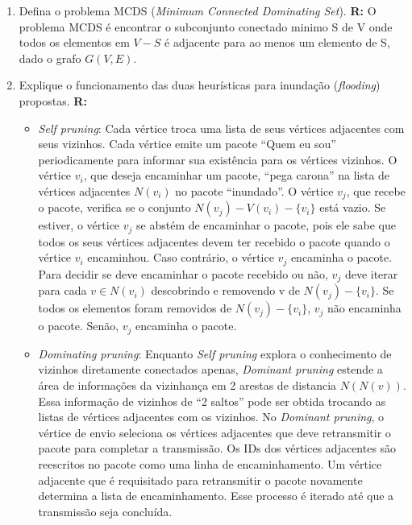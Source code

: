 \documentclass[a4paper,11pt,fleqn]{article}
\begin{document}
\begin{enumerate}
    \item{Defina o problema MCDS (\textit{Minimum Connected Dominating Set}).}
    \newline
    \textbf{R:}
        O problema MCDS é encontrar o subconjunto conectado minimo S de V
        onde todos os elementos em $V - S$ é adjacente para ao menos um elemento de S,
        dado o grafo $G(V,E)$.

    \item{Explique o funcionamento das duas heurísticas para inundação (\textit{flooding}) propostas.}
    \newline
    \textbf{R:}
        \begin{itemize}
            \item{\textit{Self pruning}:}
            Cada vértice troca uma lista de seus vértices adjacentes com
            seus vizinhos. Cada vértice emite um pacote ``Quem eu sou'' periodicamente
            para informar sua existência para os vértices vizinhos.
            O vértice $v_i$, que deseja encaminhar um pacote, ``pega carona'' na lista
            de vértices adjacentes $N(v_i)$ no pacote ``inundado''.
            O vértice $v_j$, que recebe o pacote, verifica se o conjunto $N(v_j) - V(v_i) - \{v_i\}$
            está vazio. Se estiver, o vértice $v_j$ se abstém de encaminhar o pacote, pois
            ele sabe que todos os seus vértices adjacentes devem ter recebido o pacote
            quando o vértice $v_i$ encaminhou. Caso contrário, o vértice $v_j$ encaminha o pacote.
            \newline
            Para decidir se deve encaminhar o pacote recebido ou não, $v_j$ deve iterar para
            cada $v \in N(v_i)$ descobrindo e removendo v de $N(v_j) - \{v_i\}$. Se todos os elementos
            foram removidos de $N(v_j) - \{v_i\}$, $v_j$ não encaminha o pacote. Senão, $v_j$ encaminha
            o pacote.

        \item{\textit{Dominating pruning}:}
            Enquanto \textit{Self pruning} explora o conhecimento de vizinhos diretamente conectados
            apenas, \textit{Dominant pruning} estende a área de informações da vizinhança em 2
            arestas de distancia $N(N(v))$. Essa informação de vizinhos de ``2 saltos'' pode ser
            obtida trocando as listas de vértices adjacentes com os vizinhos.
            \newline
            No \textit{Dominant pruning}, o vértice de envio seleciona os vértices adjacentes que
            deve retransmitir o pacote para completar a transmissão. Os IDs dos vértices
            adjacentes são reescritos no pacote como uma linha de encaminhamento. Um vértice
            adjacente que é requisitado para retransmitir o pacote novamente determina a
            lista de encaminhamento. Esse processo é iterado até que a transmissão seja
            concluída.


\end{itemize}
\end{enumerate}
\end{document}
